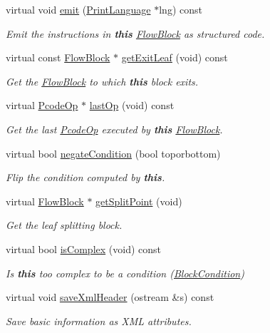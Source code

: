 \begin{DoxyCompactItemize}
virtual void \mbox{\hyperlink{class_block_copy_a4336d4193f96a1499ee1d97281548a33}{emit}} (\mbox{\hyperlink{class_print_language}{Print\+Language}} $\ast$lng) const
\begin{DoxyCompactList}\small\item\em Emit the instructions in {\bfseries{this}} \mbox{\hyperlink{class_flow_block}{Flow\+Block}} as structured code. \end{DoxyCompactList}\item 
virtual const \mbox{\hyperlink{class_flow_block}{Flow\+Block}} $\ast$ \mbox{\hyperlink{class_block_copy_ae7643bde7387390aaf61e2b4747bc5a7}{get\+Exit\+Leaf}} (void) const
\begin{DoxyCompactList}\small\item\em Get the \mbox{\hyperlink{class_flow_block}{Flow\+Block}} to which {\bfseries{this}} block exits. \end{DoxyCompactList}\item 
virtual \mbox{\hyperlink{class_pcode_op}{Pcode\+Op}} $\ast$ \mbox{\hyperlink{class_block_copy_ab07a0819d0e6527dd08240f09400c7d6}{last\+Op}} (void) const
\begin{DoxyCompactList}\small\item\em Get the last \mbox{\hyperlink{class_pcode_op}{Pcode\+Op}} executed by {\bfseries{this}} \mbox{\hyperlink{class_flow_block}{Flow\+Block}}. \end{DoxyCompactList}\item 
virtual bool \mbox{\hyperlink{class_block_copy_ad31f116ca37dd1ba235f0642365cf4f4}{negate\+Condition}} (bool toporbottom)
\begin{DoxyCompactList}\small\item\em Flip the condition computed by {\bfseries{this}}. \end{DoxyCompactList}\item 
virtual \mbox{\hyperlink{class_flow_block}{Flow\+Block}} $\ast$ \mbox{\hyperlink{class_block_copy_a86c90bb0020298ac2287ff5ab46af8a2}{get\+Split\+Point}} (void)
\begin{DoxyCompactList}\small\item\em Get the leaf splitting block. \end{DoxyCompactList}\item 
virtual bool \mbox{\hyperlink{class_block_copy_a3187e07356b398d20f12e36691522ced}{is\+Complex}} (void) const
\begin{DoxyCompactList}\small\item\em Is {\bfseries{this}} too complex to be a condition (\mbox{\hyperlink{class_block_condition}{Block\+Condition}}) \end{DoxyCompactList}\item 
virtual void \mbox{\hyperlink{class_block_copy_a67aa0188bb62e91052092088eeec70ed}{save\+Xml\+Header}} (ostream \&s) const
\begin{DoxyCompactList}\small\item\em Save basic information as X\+ML attributes. \end{DoxyCompactList}\end{DoxyCompactItemize}
